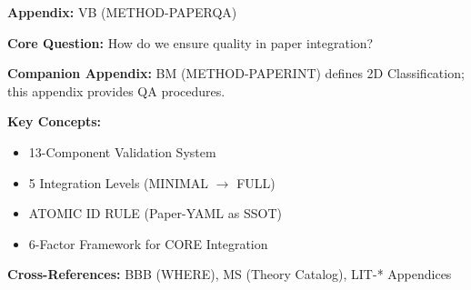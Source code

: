 \begin{tcolorbox}[colback=blue!5!white, colframe=blue!75!black,
    title=Quick Reference: Appendix UNMAPPED_VB]

\textbf{Appendix:} VB (METHOD-PAPERQA)

\textbf{Core Question:} How do we ensure quality in paper integration?

\textbf{Companion Appendix:} BM (METHOD-PAPERINT) defines 2D Classification; this appendix provides QA procedures.

\textbf{Key Concepts:}
\begin{itemize}[nosep]
\item 13-Component Validation System
\item 5 Integration Levels (MINIMAL $\rightarrow$ FULL)
\item ATOMIC ID RULE (Paper-YAML as SSOT)
\item 6-Factor Framework for CORE Integration
\end{itemize}

\textbf{Cross-References:} BBB (WHERE), MS (Theory Catalog), LIT-* Appendices
\end{tcolorbox}

\begin{abstract}
This appendix defines the standardized Paper Integration Workflow for the
Evidence-Based Framework (EBF). It specifies five integration levels
(MINIMAL to FULL), the 13-component validation system, compliance thresholds,
and the 6-Factor Framework for deciding CORE appendix integration. The workflow
ensures consistent, high-quality paper integration with full traceability.
\end{abstract}


